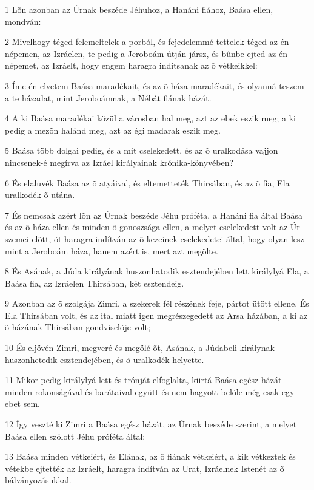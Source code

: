 \par 1 Lõn azonban az Úrnak beszéde Jéhuhoz, a Hanáni fiához, Baása ellen, mondván:
\par 2 Mivelhogy téged felemeltelek a porból, és fejedelemmé tettelek téged az én népemen, az Izráelen, te pedig a Jeroboám útján jársz, és bûnbe ejted az én népemet, az Izráelt, hogy engem haragra indítsanak az õ vétkeikkel:
\par 3 Íme én elvetem Baása maradékait, és az õ háza maradékait, és olyanná teszem a te házadat, mint Jeroboámnak, a Nébát fiának házát.
\par 4 A ki Baása maradékai közül a városban hal meg, azt az ebek eszik meg; a ki pedig a mezõn halánd meg, azt az égi madarak eszik meg.
\par 5 Baása több dolgai pedig, és a mit cselekedett, és az õ uralkodása vajjon nincsenek-é megírva az Izráel királyainak krónika-könyvében?
\par 6 És elaluvék Baása az õ atyáival, és eltemetteték Thirsában, és az õ fia, Ela  uralkodék õ utána.
\par 7 És nemcsak azért lõn az Úrnak beszéde Jéhu próféta, a Hanáni fia által Baása és az õ háza ellen és minden õ gonoszsága ellen, a melyet cselekedett volt az Úr szemei elõtt, õt haragra indítván az õ kezeinek cselekedetei által, hogy olyan lesz mint a Jeroboám háza, hanem azért is, mert azt  megölte.
\par 8 És Asának, a Júda királyának huszonhatodik esztendejében lett királylyá Ela, a Baása fia, az Izráelen Thirsában, két esztendeig.
\par 9 Azonban az õ szolgája Zimri, a szekerek fél részének feje, pártot ütött ellene. És Ela Thirsában volt, és az ital miatt igen megrészegedett az Arsa házában, a ki az õ házának Thirsában gondviselõje volt;
\par 10 És eljövén Zimri, megveré és megölé õt, Asának, a Júdabeli királynak huszonhetedik esztendejében, és õ uralkodék helyette.
\par 11 Mikor pedig királylyá lett és trónját elfoglalta, kiirtá Baása egész házát minden rokonságával és barátaival együtt és nem hagyott belõle még csak egy ebet sem.
\par 12 Így veszté ki Zimri a Baása egész házát, az Úrnak beszéde szerint, a melyet Baása ellen szólott Jéhu próféta által:
\par 13 Baása minden vétkeiért, és Elának, az õ fiának vétkeiért, a kik vétkeztek és vétekbe ejtették az Izráelt, haragra indítván az Urat, Izráelnek Istenét az õ bálványozásukkal.
